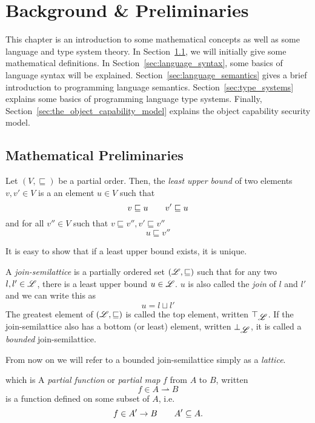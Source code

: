 \chapter{Background \& Preliminaries} \label{cha:background}

This chapter is an introduction to some mathematical concepts as well as some
language and type system theory.  In Section~\ref{sec:mathematical_definitions},
we will initially give some mathematical definitions. In
Section~\ref{sec:language_syntax}, some basics of language syntax will be
explained. Section~\ref{sec:language_semantics} gives a brief introduction to
programming language semantics. Section~\ref{sec:type_systems} explains
some basics of programming language type systems. Finally,
Section~\ref{sec:the_object_capability_model} explains the object capability
security model.

\section{Mathematical Preliminaries}
\label{sec:mathematical_definitions}

\begin{definition}
  Let $(V, \sqsubseteq)$ be a partial order. Then, the \emph{least upper bound}
  of two elements $v, v' \in V$ is a an element $u \in V$ such that
  \begin{equation*}
    v \sqsubseteq u \quad\quad v' \sqsubseteq u
  \end{equation*}
  and for all $v'' \in V$ such that $v \sqsubseteq v'', v' \sqsubseteq v''$
  \begin{equation*}
    u \sqsubseteq v''
  \end{equation*}
\end{definition}
It is easy to show that if a least upper bound exists, it is unique.
\begin{definition}
  A \emph{join-semilattice} is a partially ordered set $(\mbox{$\mathscr{L}$}, \sqsubseteq)$ such
  that for any two $l, l' \in \mbox{$\mathscr{L}$}$, there is a least upper bound $u \in
  \mbox{$\mathscr{L}$}$. $u$ is also called the \emph{join} of $l$ and $l'$ and we can write
  this as
  \begin{equation*}
    u = l \sqcup l'
  \end{equation*}
  The greatest element of $(\mbox{$\mathscr{L}$}, \sqsubseteq)$ is called the top element,
  written $\top_{\mbox{$\mathscr{L}$}}$.
  If the join-semilattice also has a bottom (or least) element, written $\bot_{\mbox{$\mathscr{L}$}}$,
  it is called a \emph{bounded} join-semilattice.
\end{definition}
From now on we will refer to a bounded join-semilattice simply as a \emph{lattice}.
\begin{definition}which is
  A \emph{partial function} or \emph{partial map} $f$ from $A$ to $B$, written
  \begin{equation*}
    f\in A \rightharpoonup B
  \end{equation*}
  is a function defined on some subset of $A$, i.e.
  \begin{equation*}
    f \in A' \to B \quad\quad A' \subseteq A.
  \end{equation*}
\end{definition}

